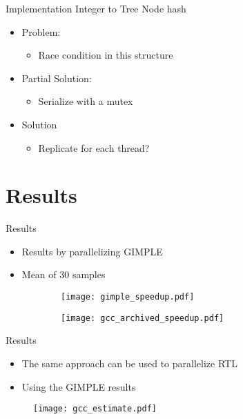 \begin{frame}{Implementation}
    Integer to Tree Node hash

    \begin{itemize}
        \item Problem:
            \begin{itemize}
                \item Race condition in this structure
            \end{itemize}
        \item Partial Solution:
            \begin{itemize}
                \item Serialize with a mutex
            \end{itemize}
        \item Solution 
            \begin{itemize}
                \item Replicate for each thread?
            \end{itemize}
    \end{itemize}
\end{frame}


\section{Results}

\begin{frame}{Results}
    \begin{itemize}
        \item Results by parallelizing GIMPLE
        \item Mean of 30 samples
    \end{itemize}

\begin{figure}[ht]
\centering
  \begin{subfigure}[b]{0.49\textwidth}
 	\texttt{[image: gimple\_speedup.pdf]}
  \end{subfigure}
  \begin{subfigure}[b]{0.49\textwidth}
 	\texttt{[image: gcc\_archived\_speedup.pdf]}
  \end{subfigure}
\end{figure}
\end{frame}

\begin{frame}{Results}
    \begin{itemize}
        \item The same approach can be used to parallelize RTL
        \item Using the GIMPLE results
    \end{itemize}

\begin{figure}[ht]
\centering
 	\texttt{[image: gcc\_estimate.pdf]}
\end{figure}
\end{frame}



